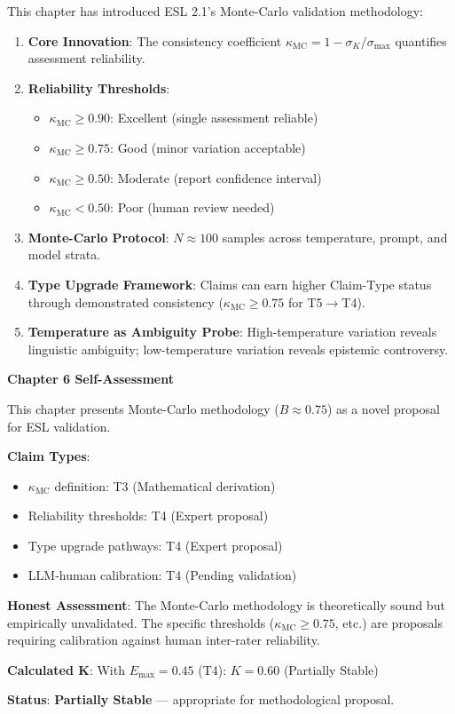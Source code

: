\documentclass[11pt,a4paper]{article}
\theoremstyle{remark}
\begin{document}
This chapter has introduced ESL 2.1's Monte-Carlo validation methodology:

\begin{enumerate}
    \item \textbf{Core Innovation}: The consistency coefficient $\kappa_{\text{MC}} = 1 - \sigma_K / \sigma_{\max}$ quantifies assessment reliability.

    \item \textbf{Reliability Thresholds}:
    \begin{itemize}
        \item $\kappa_{\text{MC}} \geq 0.90$: Excellent (single assessment reliable)
        \item $\kappa_{\text{MC}} \geq 0.75$: Good (minor variation acceptable)
        \item $\kappa_{\text{MC}} \geq 0.50$: Moderate (report confidence interval)
        \item $\kappa_{\text{MC}} < 0.50$: Poor (human review needed)
    \end{itemize}

    \item \textbf{Monte-Carlo Protocol}: $N \approx 100$ samples across temperature, prompt, and model strata.

    \item \textbf{Type Upgrade Framework}: Claims can earn higher Claim-Type status through demonstrated consistency ($\kappa_{\text{MC}} \geq 0.75$ for T5$\to$T4).

    \item \textbf{Temperature as Ambiguity Probe}: High-temperature variation reveals linguistic ambiguity; low-temperature variation reveals epistemic controversy.
\end{enumerate}

\begin{eslbox}
\textbf{Chapter 6 Self-Assessment}

This chapter presents Monte-Carlo methodology ($B \approx 0.75$) as a novel proposal for ESL validation.

\textbf{Claim Types}:
\begin{itemize}
    \item $\kappa_{\text{MC}}$ definition: T3 (Mathematical derivation)
    \item Reliability thresholds: T4 (Expert proposal)
    \item Type upgrade pathways: T4 (Expert proposal)
    \item LLM-human calibration: T4 (Pending validation)
\end{itemize}

\textbf{Honest Assessment}: The Monte-Carlo methodology is theoretically sound but empirically unvalidated. The specific thresholds ($\kappa_{\text{MC}} \geq 0.75$, etc.) are proposals requiring calibration against human inter-rater reliability.

\textbf{Calculated K}: With $E_{\max} = 0.45$ (T4): $K = 0.60$ (Partially Stable)

\textbf{Status}: \textcolor{eslorange}{\textbf{Partially Stable}} --- appropriate for methodological proposal.
\end{eslbox}
\end{document}
